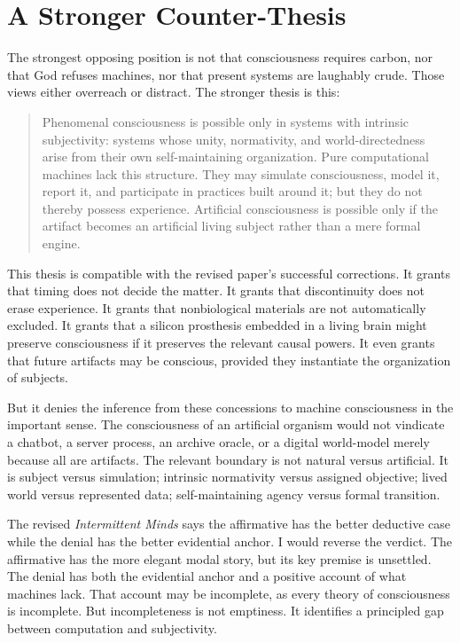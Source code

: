 \documentclass[11pt]{article}
\begin{document}
\section{A Stronger Counter-Thesis}

The strongest opposing position is not that consciousness requires carbon, nor that God refuses machines, nor that present systems are laughably crude. Those views either overreach or distract. The stronger thesis is this:

\begin{quote}
Phenomenal consciousness is possible only in systems with intrinsic subjectivity: systems whose unity, normativity, and world-directedness arise from their own self-maintaining organization. Pure computational machines lack this structure. They may simulate consciousness, model it, report it, and participate in practices built around it; but they do not thereby possess experience. Artificial consciousness is possible only if the artifact becomes an artificial living subject rather than a mere formal engine.
\end{quote}

This thesis is compatible with the revised paper's successful corrections. It grants that timing does not decide the matter. It grants that discontinuity does not erase experience. It grants that nonbiological materials are not automatically excluded. It grants that a silicon prosthesis embedded in a living brain might preserve consciousness if it preserves the relevant causal powers. It even grants that future artifacts may be conscious, provided they instantiate the organization of subjects.

But it denies the inference from these concessions to machine consciousness in the important sense. The consciousness of an artificial organism would not vindicate a chatbot, a server process, an archive oracle, or a digital world-model merely because all are artifacts. The relevant boundary is not natural versus artificial. It is subject versus simulation; intrinsic normativity versus assigned objective; lived world versus represented data; self-maintaining agency versus formal transition.

The revised \emph{Intermittent Minds} says the affirmative has the better deductive case while the denial has the better evidential anchor. I would reverse the verdict. The affirmative has the more elegant modal story, but its key premise is unsettled. The denial has both the evidential anchor and a positive account of what machines lack. That account may be incomplete, as every theory of consciousness is incomplete. But incompleteness is not emptiness. It identifies a principled gap between computation and subjectivity.
\end{document}
